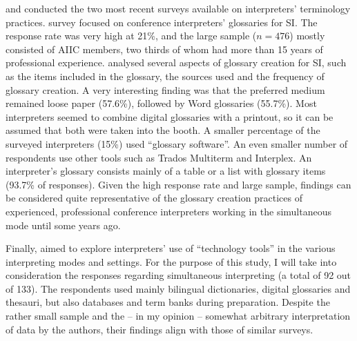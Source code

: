 \citet{jiang_interpreters_2013} and \citet{corpas_pastor_survey_2016} conducted the two most recent surveys available on interpreters' terminology practices.  survey focused on conference interpreters' glossaries for SI. The response rate was very high at 21\%, and the large sample ($n = 476$) mostly consisted of AIIC members, two thirds of whom had more than 15 years of professional experience. \citet{jiang_interpreters_2013} analysed several aspects of glossary creation for SI, such as the items included in the glossary, the sources used and the frequency of glossary creation. A very interesting finding was that the preferred medium remained loose paper (57.6\%), followed by Word glossaries (55.7\%). Most interpreters seemed to combine digital glossaries with a printout, so it can be assumed that both were taken into the booth. A smaller percentage of the surveyed interpreters (15\%) used ``glossary software''. An even smaller number of respondents use other tools such as Trados Multiterm and Interplex. An interpreter's glossary consists mainly of a table or a list with glossary items (93.7\% of responses). Given the high response rate and large sample,  findings can be considered quite representative of the glossary creation practices of experienced, professional conference interpreters working in the simultaneous mode until some years ago.

Finally, \citet{corpas_pastor_survey_2016} aimed to explore interpreters' use of ``technology tools'' in the various interpreting modes and settings. For the purpose of this study, I will take into consideration the responses regarding simultaneous interpreting (a total of 92 out of 133). The respondents used mainly bilingual dictionaries, digital glossaries and thesauri, but also databases and term banks during preparation. Despite the rather small sample and the – in my opinion – somewhat arbitrary interpretation of data by the authors, their findings align with those of similar surveys.

